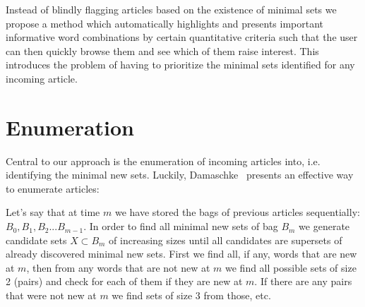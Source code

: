 Instead of blindly flagging articles based on the existence of minimal sets we propose a method which automatically highlights and presents important informative word combinations by certain quantitative criteria such that the user can then quickly browse them and see which of them raise interest. This introduces the problem of having to prioritize the minimal sets identified for any incoming article.

\section{Enumeration}
\label{method:enumeration}
Central to our approach is the enumeration of incoming articles into, i.e. identifying the minimal new sets. Luckily, Damaschke~\cite{damaschke2015pairs} presents an effective way to enumerate articles:


Let's say that at time $m$ we have stored the bags of previous articles sequentially: $B_0, B_1, B_2...B_{m-1}$. In order to find all minimal new sets of bag $B_{m}$ we generate candidate sets $X \subset B_{m}$ of increasing sizes until all candidates are supersets of already discovered minimal new sets. First we find all, if any, words that are new at $m$, then from any words that are not new at $m$ we find all possible sets of size 2 (pairs) and check for each of them if they are new at $m$. If there are any pairs that were not new at $m$ we find sets of size 3 from those, etc. 

